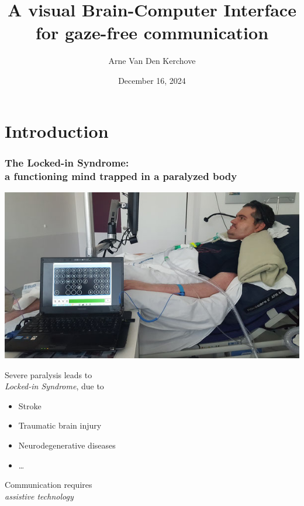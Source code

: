 \documentclass{kul-ulille-beamer}
\title{%
  A visual Brain-Computer Interface \\
  for gaze-free communication
}
\author{Arne Van Den Kerchove}
\date{December 16, 2024}
\begin{document}
\titleframe

\section{Introduction}
\begin{frame}
  \frametitle{The Locked-in Syndrome: \\ a functioning mind trapped in a paralyzed
  body}
  \begin{minipage}{.5\textwidth}
    \includegraphics[width=\textwidth]{figures/intro/damien.jpg}
  \end{minipage}\hfill%
  \begin{minipage}{.4\textwidth}
    Severe paralysis leads to \\
    \emph{Locked-in Syndrome}, due to
    \begin{itemize}
      \item Stroke
      \item Traumatic brain injury
      \item Neurodegenerative diseases
      \item \ldots
    \end{itemize}
  Communication requires \\ \emph{assistive technology}
  \end{minipage}
\end{frame}


\end{document}
